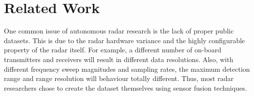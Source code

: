 \documentclass[10pt, conference, compsocconf]{IEEEtran}
\begin{document}
%
%
%
%
%
%




\section{Related Work}

One common issue of autonomous radar research is the lack of proper public datasets. This is due to the radar hardware variance and the highly configurable property of the radar itself. For example, a different number of on-board transmitters and receivers will result in different data resolutions. Also, with different frequency sweep magnitudes and sampling rates, the maximum detection range and range resolution will behaviour totally different. Thus, most radar researchers chose to create the dataset themselves using sensor fusion techniques.
\end{document}
